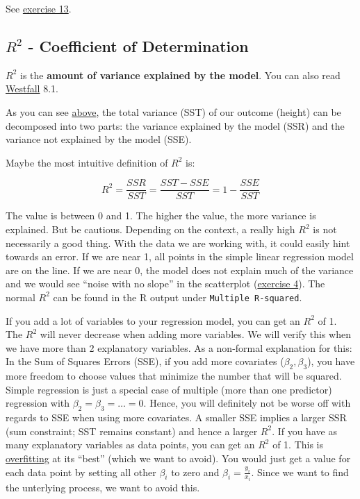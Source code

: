 \documentclass[
]{book}
\begin{document}
See \hyperref[exercise13_simpl_lin_reg]{exercise 13}.

\subsection{\texorpdfstring{\(R^2\) - Coefficient of Determination}{R\^{}2 - Coefficient of Determination}}\label{r2---coefficient-of-determination}

\href{https://en.wikipedia.org/wiki/Coefficient_of_determination}{\(R^2\)}
is the \textbf{amount of variance explained by the model}.
You can also read \href{https://www.routledge.com/Understanding-Regression-Analysis-A-Conditional-Distribution-Approach/Westfall-Arias/p/book/9780367493516?srsltid=AfmBOore3O_Ciecl0TTkr9AjPIY1d6OmbQa7o7IAdKpTSkD8s9HkwzD4}{Westfall} 8.1.

As you can see
\hyperref[analysis_of_variance]{above}, the total variance (SST) of our outcome (height)
can be decomposed into two parts: the variance explained by the model (SSR)
and the variance not explained by the model (SSE).

Maybe the most intuitive definition of \(R^2\) is:

\[R^2 = \frac{SSR}{SST} = \frac{SST - SSE}{SST} = 1 - \frac{SSE}{SST}\]

The value is between 0 and 1. The higher the value, the more variance is explained.
But be cautious. Depending on the context, a really high \(R^2\) is not
necessarily a good thing. With the data we are working with,
it could easily hint towards an error. If we are near 1,
all points in the simple linear regression model are on the line.
If we are near 0, the model does not explain much of the variance
and we would see ``noise with no slope'' in the scatterplot (\hyperref[exercise4_simpl_lin_reg]{exercise 4}).
The normal \(R^2\) can be found in the R output under \texttt{Multiple\ R-squared}.

If you add a lot of variables to your regression model, you can get an
\(R^2\) of 1. The \(R^2\) will never decrease when adding more variables.
We will verify this when we have more than 2 explanatory variables.
As a non-formal explanation for this: In the Sum of Squares Errors (SSE),
if you add more covariates (\(\beta_2, \beta_3\)), you have more freedom
to choose values that minimize the number that will be squared. Simple regression
is just a special case of multiple (more than one predictor) regression with \(\beta_2=\beta_3=\dots=0\).
Hence, you will definitely not be worse off with regards to SSE when using more covariates.
A smaller SSE implies a larger SSR (sum constraint; SST remains constant) and hence a larger \(R^2\).
If you have as many explanatory variables as data points, you can get an \(R^2\) of 1. This is
\href{https://en.wikipedia.org/wiki/Overfitting}{overfitting} at its ``best'' (which we want to avoid).
You would just get a value for each data point by setting all other \(\beta_i\) to zero and
\(\beta_i = \frac{y_i}{x_i}\).
Since we want to find the unterlying process, we want to avoid this.
\end{document}
